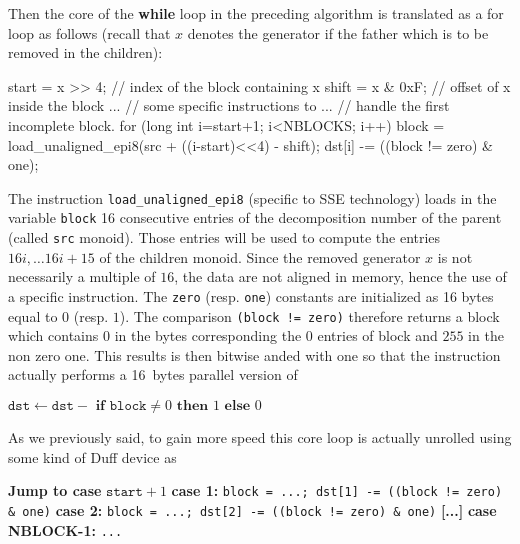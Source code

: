 \documentclass[reqno,11pt]{amsart}
\theoremstyle{plain}
\theoremstyle{definition}
\renewcommand{\tt}[1]{\texttt{#1}}
\begin{document}
Then the core of the \textbf{while} loop in the preceding algorithm is
translated as a for loop as follows (recall that $x$ denotes the generator if the
father which is to be removed in the children):
\begin{listing}{1}
start = x >> 4;      // index of the block containing x
shift = x & 0xF;     // offset of x inside the block
...                  // some specific instructions to
...                  // handle the first incomplete block.
for (long int i=start+1; i<NBLOCKS; i++) {
  block = load_unaligned_epi8(src + ((i-start)<<4) - shift);
  dst[i] -= ((block != zero) & one);
}
\end{listing}
The instruction \tt{load\_unaligned\_epi8} (specific to SSE technology) loads
in the variable \tt{block} 16 consecutive entries of the decomposition number
of the parent (called \tt{src} monoid). Those entries will be used to compute
the entries $16i, \dots 16i+15$ of the children monoid. Since the removed
generator $x$ is not necessarily a multiple of $16$, the data are not aligned
in memory, hence the use of a specific instruction. The \tt{zero}
(resp. \tt{one}) constants are initialized as 16 bytes equal to $0$
(resp. $1$). The comparison \tt{(block != zero)} therefore returns a block
which contains $0$ in the bytes corresponding the $0$ entries of block and
$255$ in the non zero one. This results is then bitwise anded with one so that
the instruction actually performs a 16~bytes parallel version of
\begin{algorithmic}
\State $\tt{dst} \gets \tt{dst} -
\textbf{ if } \tt{block} \neq 0 \textbf{ then } 1 \textbf{ else } 0$
\end{algorithmic}
As we previously said, to gain more speed this core loop is actually unrolled
using some kind of Duff device as
\begin{algorithmic}
\State \textbf{Jump to case } $\tt{start}+1$
\State \textbf{case 1:} \tt{block = ...; dst[1] -= ((block != zero) \& one)}
\State \textbf{case 2:} \tt{block = ...; dst[2] -= ((block != zero) \& one)}
\State \textbf{[...]}
\State \textbf{case NBLOCK-1:} \tt{...}
\end{algorithmic}


\end{document}
